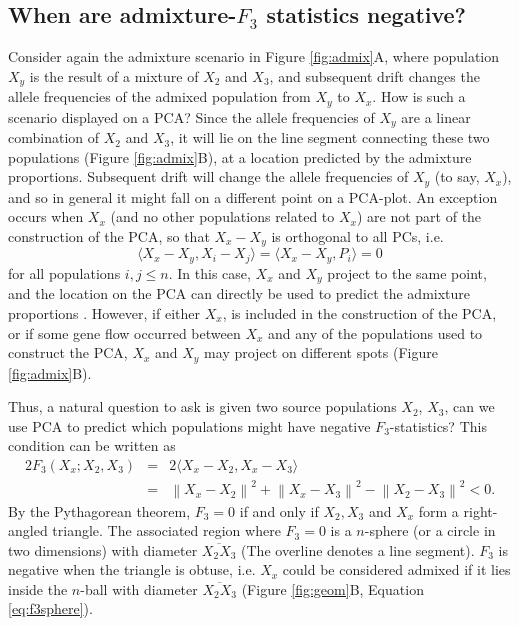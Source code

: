 \documentclass[12pt,fullpage, a4paper]{article}
\newcommand{\normsq}[1]{\left\lVert#1\right\rVert^2}
\begin{document}
\subsection{When are admixture-$F_3$ statistics negative?}
Consider again the admixture scenario in Figure \ref{fig:admix}A, where population $X_y$ is the result of a mixture of $X_2$ and $X_3$, and subsequent drift changes the allele frequencies of the admixed population from $X_y$ to $X_x$. How is such a scenario displayed on a PCA?  Since the allele frequencies of $X_y$ are a linear combination of $X_2$ and $X_3$, it will lie on the line segment connecting these two populations (Figure \ref{fig:admix}B), at a location predicted by the admixture proportions. Subsequent drift will change the allele frequencies of $X_y$ (to say, $X_x$), and so in general it might fall on a different point on a PCA-plot. An exception occurs when $X_x$ (and no other populations related to $X_x$) are not part of the construction of the PCA, so that $X_x - X_y$ is orthogonal to all PCs, i.e. $$\langle X_x - X_y, X_i - X_j \rangle = \langle X_x - X_y, P_i \rangle = 0$$ for all populations $i,j \leq n$. In this case, $X_x$ and $X_y$ project to the same point, and the location on the PCA  can directly be used to predict the admixture proportions \citep{mcvean2009, brisbin2012, oteo-garcia2021}. However, if either $X_x$, is included in the construction of the PCA, or if some gene flow occurred between $X_x$ and any of the populations used to construct the PCA, $X_x$ and $X_y$ may project on different spots (Figure \ref{fig:admix}B). 

Thus, a natural question to ask is given two source populations $X_2$, $X_3$, can we use PCA to predict which populations might have negative $F_3$-statistics? This condition can be written as  
\begin{eqnarray}
2 F_3(X_x; X_2, X_3) &=& 2\langle  X_x - X_2, X_x - X_3 \rangle \nonumber\\
      &=& \normsq{X_x - X_2} + \normsq{X_x - X_3}  - \normsq{X_2 - X_3} < 0 \label{eq:f3neg}\text{.}
\end{eqnarray}
By the Pythagorean theorem, $F_3 = 0 $ if and only if $X_2, X_3$ and $X_x$ form a right-angled triangle. The associated region where $F_3=0$ is a $n$-sphere (or a circle in two dimensions) with diameter $\overline{X_2X_3}$ (The overline denotes a line segment). $F_3$ is negative when the triangle is obtuse, i.e. $X_x$ could be considered admixed if it lies inside the $n$-ball with diameter $\overline{X_2X_3}$ (Figure \ref{fig:geom}B, Equation \ref{eq:f3sphere}). 
\end{document}
